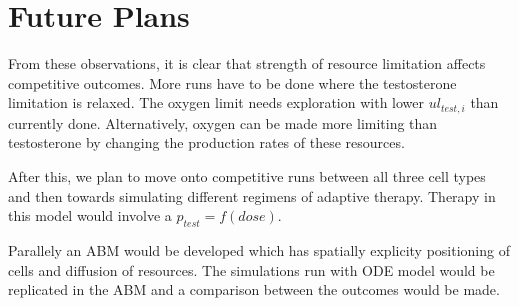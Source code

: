 \documentclass[11pt,a4paper]{article}
\begin{document}
\begin{itemize}
\end{itemize}

\section{Future Plans}
From these observations, it is clear that strength of resource limitation affects competitive outcomes. More runs have to be done where the testosterone limitation is relaxed. The oxygen limit needs exploration with lower $ul_{test,i}$ than currently done. Alternatively, oxygen can be made more limiting than testosterone by changing the production rates of these resources.

After this, we plan to move onto competitive runs between all three cell types and then towards simulating different regimens of adaptive therapy. Therapy in this model would involve a $p_{test} = f(dose)$.

Parallely an ABM would be developed which has spatially explicity positioning of cells and diffusion of resources. The simulations run with ODE model would be replicated in the ABM and a comparison between the outcomes would be made.

\printbibliography
\end{document}

